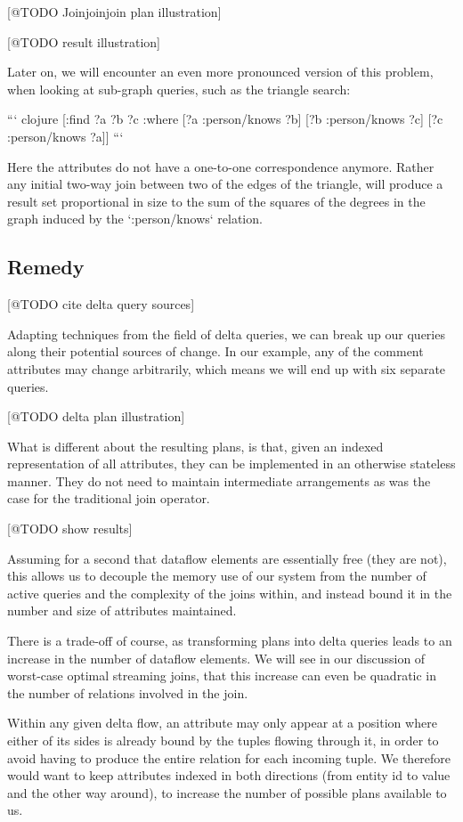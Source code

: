 \documentclass[../catalog.tex]{subfiles}
\begin{document}
[@TODO Joinjoinjoin plan illustration]

[@TODO result illustration]

Later on, we will encounter an even more pronounced version of this
problem, when looking at sub-graph queries, such as the triangle
search:

``` clojure
[:find ?a ?b ?c
 :where
 [?a :person/knows ?b]
 [?b :person/knows ?c]
 [?c :person/knows ?a]]
```

Here the attributes do not have a one-to-one correspondence
anymore. Rather any initial two-way join between two of the edges of
the triangle, will produce a result set proportional in size to the
sum of the squares of the degrees in the graph induced by the
`:person/knows` relation.

\subsection{Remedy}

[@TODO cite delta query sources]

Adapting techniques from the field of delta queries, we can break up
our queries along their potential sources of change. In our example,
any of the comment attributes may change arbitrarily, which means we
will end up with six separate queries.

[@TODO delta plan illustration]

What is different about the resulting plans, is that, given an indexed
representation of all attributes, they can be implemented in an
otherwise stateless manner. They do not need to maintain intermediate
arrangements as was the case for the traditional join operator.

[@TODO show results]

Assuming for a second that dataflow elements are essentially free
(they are not), this allows us to decouple the memory use of our
system from the number of active queries and the complexity of the
joins within, and instead bound it in the number and size of
attributes maintained.

There is a trade-off of course, as transforming plans into delta
queries leads to an increase in the number of dataflow elements. We
will see in our discussion of worst-case optimal streaming joins, that
this increase can even be quadratic in the number of relations
involved in the join.

Within any given delta flow, an attribute may only appear at a
position where either of its sides is already bound by the tuples
flowing through it, in order to avoid having to produce the entire
relation for each incoming tuple. We therefore would want to keep
attributes indexed in both directions (from entity id to value and the
other way around), to increase the number of possible plans available
to us.
\end{document}

